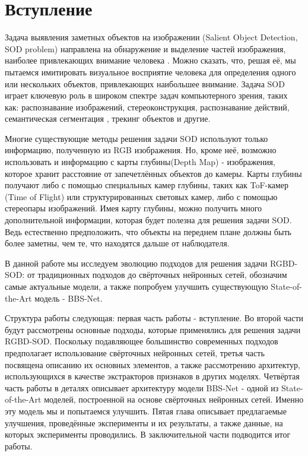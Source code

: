 \section{Вступление}

Задача выявления заметных объектов на изображении (Salient Object Detection, SOD problem) направлена на
обнаружение и выделение частей изображения, наиболее привлекающих внимание
человека \cite{Is-Depth-Really-Necessary-for-SOD}. Можно сказать, что, решая её, мы пытаемся имитировать визуальное восприятие человека для определения одного
или нескольких объектов, привлекающих наибольшее внимание. Задача SOD играет ключевую роль в широком спектре задач компьютерного зрения, таких как:
распознавание изображений\cite{Image-Understanding}, стереоконструкция\cite{Stereo-Matching},
распознавание действий\cite{Action-Recognition}, семантическая сегментация \cite{Semantic-Segmentation-1} \cite{Semantic-Segmentation-2},
трекинг объектов\cite{Pattern-Recognition} и другие.

Многие существующие методы решения задачи SOD используют только информацию, полученную из RGB изображения.
Но, кроме неё, возможно использовать и информацию с карты глубины(Depth Map) - изображения, которое хранит расстояние от запечетлённых объектов до камеры.
Карты глубины получают либо с помощью специальных камер глубины, таких как ToF-камер (Time of Flight) или структурированных световых камер, либо с помощью
стереопары изображений. Имея карту глубины, можно получить много дополнительной информации, которая будет полезна для решения задачи SOD. Ведь естественно предположить,
что объекты на переднем плане должны быть более заметны, чем те, что находятся дальше от наблюдателя.

В данной работе мы исследуем эволюцию подходов для решения задачи RGBD-SOD: от традиционных подходов до свёрточных нейронных сетей, обозначим самые актуальные модели,
а также попробуем улучшить существующую State-of-the-Art модель - BBS-Net\cite{BBS}.

Структура работы следующая: первая часть работы - вступление. Во второй части будут рассмотрены основные подходы, которые применялись для решения задачи RGBD-SOD. Поскольку подавляющее большинство
современных подходов предполагает использование свёрточных нейронных сетей, третья часть посвящена описанию их основных элементов, а также рассмотрению
архитектур, использующихся в качестве экстракторов признаков в других моделях. Четвёртая часть работы в деталях описывает архитектуру модели BBS-Net\cite{BBS} - одной
из State-of-the-Art моделей, построенной на основе свёрточных нейронных сетей. Именно эту модель мы и попытаемся улучшить. Пятая глава
описывает предлагаемые улучшения, проведённые эксперименты и их результаты, а также данные, на которых эксперименты проводились. В заключительной части
подводится итог работы.